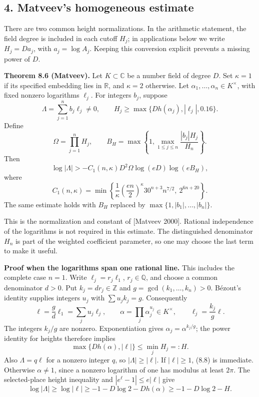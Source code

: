 \documentclass[
  11pt,
  a4paper,
]{article}
\begin{document}
\subsection{4. Matveev's homogeneous
estimate}\label{matveevs-homogeneous-estimate}

There are two common height normalizations. In the arithmetic statement,
the field degree is included in each cutoff \(H_j\); in applications
below we write \(H_j=D a_j\), with \(a_j=\log A_j\). Keeping this
conversion explicit prevents a missing power of \(D\).

\textbf{Theorem 8.6 (Matveev).} Let \(K\subset\mathbb C\) be a number
field of degree \(D\). Set \(\kappa=1\) if its specified embedding lies
in \(\mathbb R\), and \(\kappa=2\) otherwise. Let
\(\alpha_1,\ldots,\alpha_n\in K^\times\), with fixed nonzero logarithms
\(\ell_j\). For integers \(b_j\), suppose \[
\Lambda=\sum_{j=1}^n b_j\ell_j\ne0,\qquad
H_j\ge\max\{D h(\alpha_j),|\ell_j|,0.16\}.
\] Define \[
\Omega=\prod_{j=1}^n H_j,\qquad
B_H=\max\left\{1,\max_{1\le j\le n}\frac{|b_j|H_j}{H_n}\right\}.
\] Then \[
\log|\Lambda|>
-C_1(n,\kappa)D^2\Omega\log(eD)\log(eB_H), \tag{8.8}
\] where \[
C_1(n,\kappa)=
\min\left\{
\frac1\kappa\left(\frac{en}{2}\right)^\kappa
30^{n+3}n^{7/2},\
2^{6n+20}
\right\}. \tag{8.9}
\] The same estimate holds with \(B_H\) replaced by
\(\max\{1,|b_1|,\ldots,|b_n|\}\).

This is the normalization and constant of {[}Matveev 2000{]}. Rational
independence of the logarithms is not required in this estimate. The
distinguished denominator \(H_n\) is part of the weighted coefficient
parameter, so one may choose the last term to make it useful.

\textbf{Proof when the logarithms span one rational line.} This includes
the complete case \(n=1\). Write \(\ell_j=r_j\ell_1\),
\(r_j\in\mathbb Q\), and choose a common denominator \(d>0\). Put
\(k_j=d r_j\in\mathbb Z\) and \(g=\gcd(k_1,\ldots,k_n)>0\). Bézout's
identity supplies integers \(u_j\) with \(\sum u_jk_j=g\). Consequently
\[
\ell=\frac gd\ell_1=\sum_j u_j\ell_j,\qquad
\alpha=\prod_j\alpha_j^{u_j}\in K^\times,\qquad
\ell_j=\frac{k_j}{g}\ell.
\] The integers \(k_j/g\) are nonzero. Exponentiation gives
\(\alpha_j=\alpha^{k_j/g}\); the power identity for heights therefore
implies \[
\max\{D h(\alpha),|\ell|\}\le \min_j H_j=:H.
\] Also \(\Lambda=q\ell\) for a nonzero integer \(q\), so
\(|\Lambda|\ge|\ell|\). If \(|\ell|\ge1\), (8.8) is immediate. Otherwise
\(\alpha\ne1\), since a nonzero logarithm of one has modulus at least
\(2\pi\). The selected-place height inequality and
\(|e^\ell-1|\le e|\ell|\) give \[
\log|\Lambda|\ge\log|\ell|
\ge-1-D\log2-Dh(\alpha)\ge-1-D\log2-H. \tag{8.10}
\]
\end{document}
